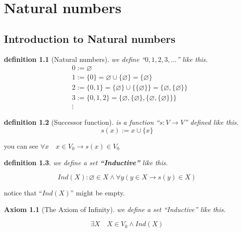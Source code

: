 \documentclass[10pt,a4paper]{book}
\let\emptyset\varnothing
\newtheorem{definition}{definition}[section]
\newtheorem{axiom}{Axiom}[section]
\begin{document}
\chapter{ Natural numbers  }

\section{Introduction to Natural numbers}

\begin{definition}
    [Natural numbers] we define ``$0,1,2,3,...$'' like this.
    \begin{align*}
         &
        0 := \emptyset
        \\
         &
        1 :=\{0\}= \emptyset \cup \{ \emptyset \} = \{ \emptyset \}
        \\
         &
        2 := \{0,1\}=\{ \emptyset \} \cup \big\{ \{ \emptyset \} \big\} = \big\{ \emptyset , \{ \emptyset \} \big\}
        \\
         &
        3 := \{0,1,2\}=\Big\{ \emptyset , \{ \emptyset \},\big\{ \emptyset , \{ \emptyset \} \big\} \Big\} \\
         & \vdots
    \end{align*}

\end{definition}

\begin{definition}
    [Successor function] is a function ``$s :V \to V$'' defined like this.
    \[s(x) := x\cup \{x\}\]
\end{definition}

you can see $\forall x \quad x   \in V_0 \to s(x)   \in V_0$

\begin{definition}
    we define a set  \textbf{``Inductive''} like this.

    \[
        Ind(X) :  \emptyset\in X \wedge \forall y(y\in X\to s(y) \in X)
    \]

\end{definition}

notice that ``$Ind(X)$'' might be empty.

\begin{axiom}
    [The Axiom of Infinity] we define a set ``Inductive'' like this.

    \[
        \exists X \quad X \in V_0 \land Ind(X)
    \]

\end{axiom}
\end{document}
